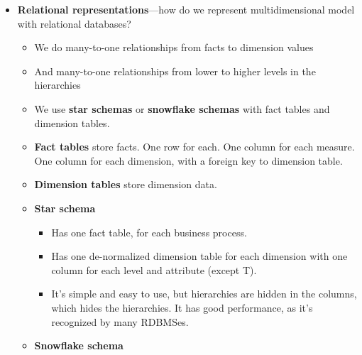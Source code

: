 \begin{multicols}{2}
\begin{itemize}
\begin{itemize}
    \begin{itemize}
        \item
      \textbf{Solutions}: 2 and 3 are here. Dimension splitting (4) is
      good.
    \item
      So look at frequently changing attributes and separate those from
      those that don't change as often. Then create two new
      `minidimensions'.
    \item
      Then you can even optimize further: frequently changing
      \emph{numeric} attributes can become discrete / banded values
      (within a range). That leads to info loss, but that often happens
      during analysis anyway.
    \item
      To maintain relationship between the new minidimensions, can add
      surrogate keys for both into the fact table---so each new entry in
      fact table you also get the surrogate key for each new dimension.
    \end{itemize}
  \end{itemize}
\item
  \textbf{Relational representations}---how do we represent
  multidimensional model with relational databases?

  \begin{itemize}
    \item
    We do many-to-one relationships from facts to dimension values
  \item
    And many-to-one relationships from lower to higher levels in the
    hierarchies
  \item
    We use \textbf{star schemas} or \textbf{snowflake schemas} with fact
    tables and dimension tables.
  \item
    \textbf{Fact tables} store facts. One row for each. One column for
    each measure. One column for each dimension, with a foreign key to
    dimension table.
  \item
    \textbf{Dimension tables} store dimension data.
  \item
    \textbf{Star schema}

    \begin{itemize}
        \item
      Has one fact table, for each business process.
    \item
      Has one de-normalized dimension table for each dimension with one
      column for each level and attribute (except T).
    \item
      It's simple and easy to use, but hierarchies are hidden in the
      columns, which hides the hierarchies. It has good performance, as
      it's recognized by many RDBMSes.
    \end{itemize}
  \item
    \textbf{Snowflake schema}


\end{itemize}
\end{itemize}
\end{multicols}
